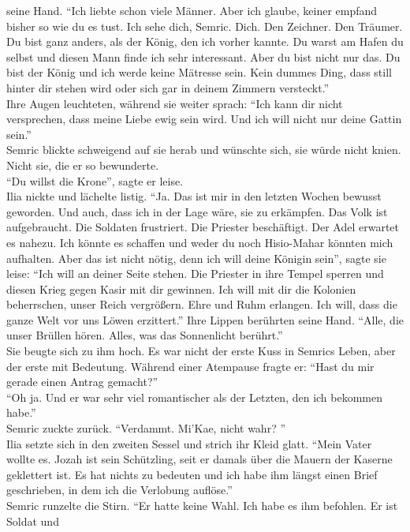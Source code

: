 seine Hand. ``Ich liebte schon viele Männer. Aber ich glaube, keiner empfand bisher so 
wie du es tust. Ich sehe dich, Semric. Dich. Den Zeichner. Den Träumer. Du bist ganz anders, als 
der König, den ich vorher kannte. Du warst am Hafen du selbst und diesen Mann finde ich sehr 
interessant. Aber du bist nicht nur das. Du bist der König und ich werde keine Mätresse sein. 
Kein dummes Ding, dass still hinter dir stehen wird oder sich gar in deinem Zimmern versteckt.''\\
Ihre Augen leuchteten, während sie weiter sprach: ``Ich kann dir nicht versprechen, dass meine 
Liebe ewig sein wird. Und ich will nicht nur deine Gattin sein.''\\
Semric blickte schweigend auf sie herab und wünschte sich, sie würde nicht knien. Nicht sie, die er 
so bewunderte.\\
``Du willst die Krone'', sagte er leise.\\
Ilia nickte und lächelte listig. ``Ja. Das ist mir in den letzten Wochen bewusst geworden. Und 
auch, dass ich in der Lage wäre, sie zu erkämpfen. Das Volk ist aufgebraucht. Die Soldaten 
frustriert. Die Priester beschäftigt. Der Adel erwartet es nahezu. Ich könnte es schaffen und weder 
du noch Hisio-Mahar könnten mich aufhalten. Aber das ist nicht nötig, denn ich will deine Königin 
sein'', sagte sie leise: ``Ich will an deiner Seite stehen. Die Priester in ihre Tempel sperren und 
diesen Krieg gegen Kasir mit dir gewinnen. Ich will mit dir die Kolonien beherrschen, unser Reich 
vergrößern. Ehre und Ruhm erlangen. Ich will, dass die ganze Welt vor uns Löwen erzittert.'' Ihre 
Lippen berührten seine Hand. ``Alle, die unser Brüllen hören. Alles, was das Sonnenlicht 
berührt.''\\
Sie beugte sich zu ihm hoch. Es war nicht der erste Kuss in Semrics Leben, aber der erste mit 
Bedeutung. Während einer Atempause fragte er: ``Hast du mir gerade einen Antrag gemacht?''\\
``Oh ja. Und er war sehr viel romantischer als der Letzten, den ich bekommen habe.''\\
Semric zuckte zurück. ``Verdammt. Mi'Kae, nicht wahr? ''\\
Ilia setzte sich in den zweiten Sessel und strich ihr Kleid glatt. ``Mein Vater wollte es. Jozah 
ist sein Schützling, seit er damals über die Mauern der Kaserne geklettert ist. Es hat nichts zu 
bedeuten und ich habe ihm längst einen Brief geschrieben, in dem ich die Verlobung auflöse.''\\
Semric runzelte die Stirn. ``Er hatte keine Wahl. Ich habe es ihm befohlen. Er ist Soldat und 
